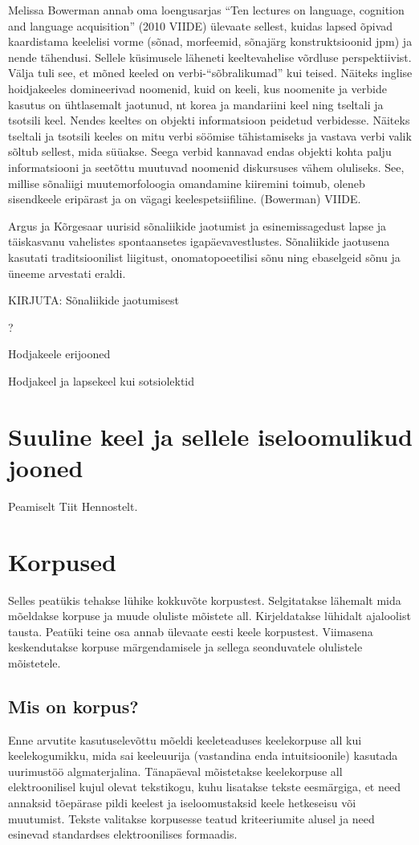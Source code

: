 \documentclass[12pt]{article}
\begin{document}
 Melissa Bowerman annab oma loengusarjas ``Ten lectures on language, cognition and language acquisition'' (2010 VIIDE) ülevaate sellest, kuidas lapsed õpivad kaardistama keelelisi vorme (sõnad, morfeemid, sõnajärg konstruktsioonid jpm) ja nende tähendusi. Sellele küsimusele läheneti keeltevahelise võrdluse perspektiivist. Välja tuli see, et mõned keeled on verbi-``sõbralikumad'' kui teised. Näiteks inglise hoidjakeeles domineerivad noomenid, kuid on keeli, kus noomenite ja verbide kasutus on ühtlasemalt jaotunud, nt korea ja mandariini keel ning tseltali ja tsotsili keel. Nendes keeltes on objekti informatsioon peidetud verbidesse. Näiteks tseltali ja tsotsili keeles on mitu verbi söömise tähistamiseks ja vastava verbi valik sõltub sellest, mida süüakse. Seega verbid kannavad endas objekti kohta palju informatsiooni ja seetõttu muutuvad noomenid diskursuses vähem oluliseks. See, millise sõnaliigi muutemorfoloogia omandamine kiiremini toimub, oleneb sisendkeele eripärast ja on vägagi keelespetsiifiline. (Bowerman) VIIDE.

Argus ja Kõrgesaar uurisid sõnaliikide jaotumist ja esinemissagedust lapse ja täiskasvanu vahelistes spontaansetes igapäevavestlustes. Sõnaliikide jaotusena kasutati traditsioonilist liigitust, onomatopoeetilisi sõnu ning ebaselgeid sõnu ja üneeme arvestati eraldi. 




KIRJUTA:
Sõnaliikide jaotumisest

?

Hodjakeele erijooned

Hodjakeel ja lapsekeel kui sotsiolektid




\newpage
\section{Suuline keel ja sellele iseloomulikud jooned}
Peamiselt Tiit Hennostelt.

\newpage
\section{Korpused}
Selles peatükis tehakse lühike kokkuvõte korpustest. Selgitatakse lähemalt mida mõeldakse korpuse ja muude
oluliste mõistete all. Kirjeldatakse lühidalt ajaloolist tausta. Peatüki teine osa annab ülevaate eesti keele korpustest. Viimasena keskendutakse korpuse märgendamisele ja sellega seonduvatele olulistele mõistetele.

\subsection{Mis on korpus?}
Enne arvutite kasutuselevõttu mõeldi keeleteaduses keelekorpuse all kui keelekogumikku, mida sai
keeleuurija (vastandina enda intuitsioonile) kasutada uurimustöö algmaterjalina. Tänapäeval mõistetakse
keelekorpuse all elektroonilisel kujul olevat tekstikogu, kuhu lisatakse tekste eesmärgiga, et need annaksid
tõepärase pildi keelest ja iseloomustaksid keele hetkeseisu või muutumist. Tekste valitakse korpusesse teatud kriteeriumite alusel ja need esinevad standardses elektroonilises formaadis. \citep[9]{KR}
\end{document}
